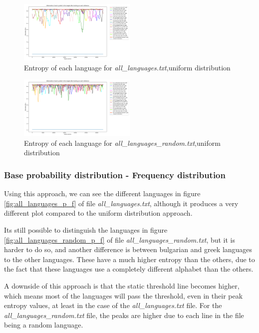 \documentclass{article}
\begin{document}
\begin{figure}
    \centering
    \includegraphics[width=0.5\textwidth]{../results/all_languages/-p_u.png}
    \caption{Entropy of each language for \textit{all\_languages.txt},uniform distribution}
    \label{fig:all_languages_p_u}
\end{figure}

\begin{figure}
    \centering
    \includegraphics[width=0.5\textwidth]{../results/all_languages_random/-p_u.png}
    \caption{Entropy of each language for \textit{all\_languages\_random.txt},uniform distribution}
    \label{fig:all_languages_random_p_u}
\end{figure}

\subsubsection{Base probability distribution - Frequency distribution}
\label{subsubsec:results_locate_lang_frequency_distribution}

Using this approach, we can see the different languages in figure \ref{fig:all_languages_p_f} of file \textit{all\_languages.txt}, although it produces a very different plot
compared to the uniform distribution approach.

Its still possible to distinguish the languages in figure \ref{fig:all_languages_random_p_f} of file \textit{all\_languages\_random.txt}, but it is harder to do so,
and another difference is between bulgarian and greek languages to the other languages. These have a much higher entropy than the others, due to the fact that these
languages use a completely different alphabet than the others.

A downside of this approach is that the static threshold line becomes higher, which means most of the languages will pass the threshold, even in their peak entropy values,
at least in the case of the \textit{all\_languages.txt} file. For the \textit{all\_languages\_random.txt} file, the peaks are higher due to each line in the file being a random language.
\end{document}
